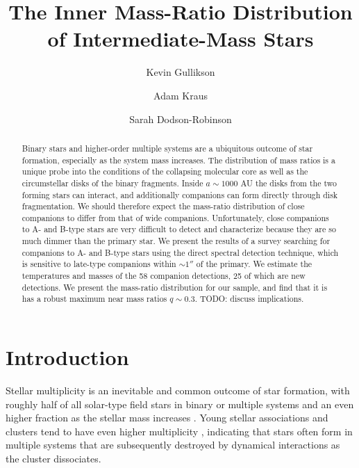 \documentclass{emulateapj}
\begin{document}
\title{The Inner Mass-Ratio Distribution of Intermediate-Mass Stars}

\author{Kevin Gullikson }
\author{Adam Kraus }
\author{Sarah Dodson-Robinson }



\begin{abstract}
Binary stars and higher-order multiple systems are a ubiquitous outcome of star formation, especially as the system mass increases. The distribution of mass ratios is a unique probe into the conditions of the collapsing molecular core as well as the circumstellar disks of the binary fragments. Inside $a \sim 1000$ AU the disks from the two forming stars can interact, and additionally companions can form directly through disk fragmentation. We should therefore expect the mass-ratio distribution of close companions to differ from that of wide companions. Unfortunately, close companions to A- and B-type stars are very difficult to detect and characterize because they are so much dimmer than the primary star. We present the results of a survey searching for companions to A- and B-type stars using the direct spectral detection technique, which is sensitive to late-type companions within $\sim 1''$ of the primary. We estimate the temperatures and masses of the 58 companion detections, 25 of which are new detections. We present the mass-ratio distribution for our sample, and find that it is has a robust maximum near mass ratios $q \sim 0.3$. TODO: discuss implications.
\end{abstract}

\maketitle

\section{Introduction}


\label{sec:intro}

Stellar multiplicity is an inevitable and common outcome of star formation, with roughly half of all solar-type field stars in binary or multiple systems \citep{Raghavan2010} and an even higher fraction as the stellar mass increases \citep{Zinnecker2007}. Young stellar associations and clusters tend to have even higher multiplicity \citep{Duchene2013}, indicating that stars often form in multiple systems that are subsequently destroyed by dynamical interactions as the cluster dissociates. 
\end{document}
